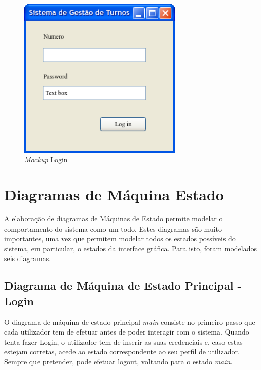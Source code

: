 \documentclass[12pt,a4paper]{report}
\begin{document}
\paragraph{}
\begin{figure}[H]
	\centering 
	\includegraphics[width=0.7\textwidth]{modelacao/mockups/login.png}  
	\caption{\emph{Mockup} Login}
\end{figure}


\chapter{Diagramas de Máquina Estado}
A elaboração de diagramas de Máquinas de Estado permite modelar o comportamento do sistema como um todo. Estes diagramas são muito importantes, uma vez que permitem modelar todos os estados possíveis do sistema, em particular, o estados da interface gráfica. Para isto, foram modelados seis diagramas.
\section{Diagrama de Máquina de Estado Principal - Login}

O diagrama de máquina de estado principal \textit{main} consiste no primeiro passo que cada utilizador tem de efetuar antes de poder interagir com o sistema. Quando tenta fazer Login, o utilizador tem de inserir as suas credenciais e, caso estas estejam corretas, acede ao estado correspondente ao seu perfil de utilizador. Sempre que pretender, pode efetuar logout, voltando para o estado \textit{main}.
\end{document}
